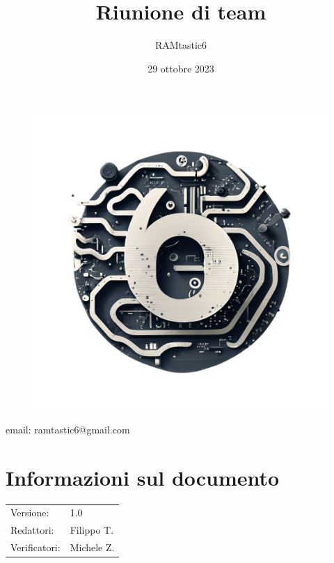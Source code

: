 \documentclass[12pt, oneside]{article}
\author{RAMtastic6}
\begin{document}
\thispagestyle{empty}
\title{Riunione di team}
\date{29 ottobre 2023} %

\maketitle
\begin{figure}[h]
	\centering
	\includegraphics[scale=0.3]{logo.png}
	\label{}
\end{figure}
\begin{center}
    email: ramtastic6@gmail.com
\end{center}

\section*{Informazioni sul documento}
\begin{tabular}{ll}
Versione: & 1.0 \\
Redattori: & Filippo T. \\
Verificatori: & Michele Z. \\
\end{tabular}
\newpage

\tableofcontents
\newpage

\end{document}
